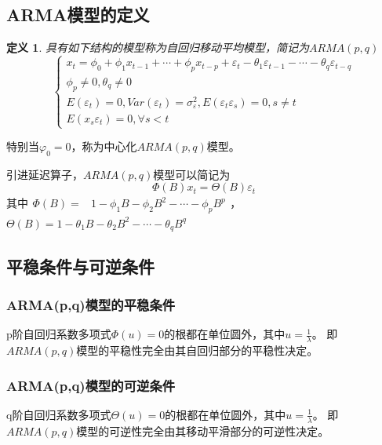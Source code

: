 \documentclass[12pt, a4paper, oneside]{ctexbook}
\newtheorem{definition}[theorem]{定义}
\begin{document}
\subsection{ARMA模型的定义}
\begin{definition}
    具有如下结构的模型称为自回归移动平均模型，简记为$ARMA(p,q)$
    \begin{equation}
        \begin{cases}
            x_t=\phi_0+\phi_1x_{t-1}+\cdots+\phi_px_{t-p}+\varepsilon_t-\theta_1\varepsilon_{t-1}-\cdots-\theta_q\varepsilon_{t-q} \\
            \phi_p\neq0,\theta_q\neq0                                                                                              \\
            E(\varepsilon_t)=0,Var(\varepsilon_t)=\sigma_\varepsilon^2,E(\varepsilon_t\varepsilon_s)=0,s\neq t                     \\
            E(x_s\varepsilon_t)=0,\forall s<t
        \end{cases}
    \end{equation}
\end{definition}
特别当$\varphi_0 = 0$，称为中心化$ARMA(p,q)$模型。

引进延迟算子，$ARMA(p,q)$模型可以简记为
\begin{equation}
    \Phi(B)x_t=\Theta(B)\varepsilon_t
\end{equation}
其中$\begin{aligned}\Phi(B)=&1-\phi_1B-\phi_2B^2-\cdots-\phi_pB^p\end{aligned}$，
$\Theta(B)=1-\theta_1B-\theta_2B^2-\cdots-\theta_qB^q$

\subsection{平稳条件与可逆条件}
\subsubsection{ARMA(p,q)模型的平稳条件}
p阶自回归系数多项式$\Phi(u)=0$的根都在单位圆外，其中$u = \frac1\lambda$。
即$ARMA(p,q)$模型的平稳性完全由其自回归部分的平稳性决定。

\subsubsection{ARMA(p,q)模型的可逆条件}
q阶自回归系数多项式$\Theta(u)=0$的根都在单位圆外，其中$u = \frac1\lambda$。
即$ARMA(p,q)$模型的可逆性完全由其移动平滑部分的可逆性决定。
\end{document}
